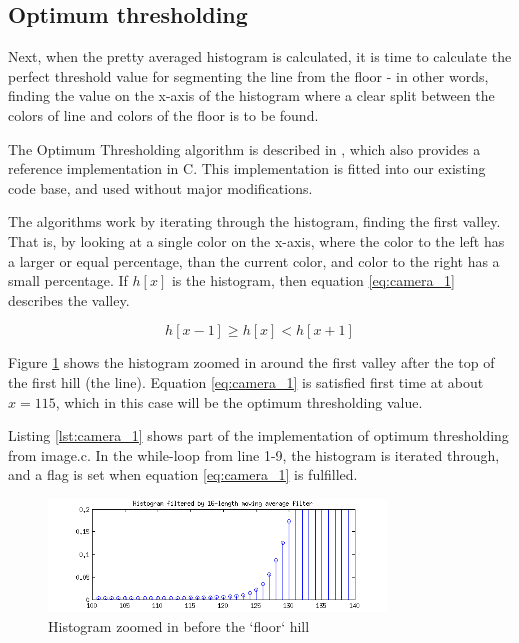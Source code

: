 
%
%
%
%
\subsection{Optimum thresholding}

Next, when the pretty averaged histogram is calculated, it is time to calculate the perfect threshold value for segmenting the line from the floor - in other words, finding the value on the x-axis of the histogram where a clear split between the colors of line and colors of the floor is to be found.

The Optimum Thresholding algorithm is described in \citep{myler1993}, which also provides a reference implementation in C. This implementation is fitted into our existing code base, and used without major modifications.  

The algorithms work by iterating through the histogram, finding the first valley. That is, by looking at a single color on the x-axis, where the color to the left has a larger or equal percentage, than the current color, and color to the right has a small percentage. If $h[x]$ is the histogram, then equation \ref{eq:camera_1} describes the valley.

\begin{equation}\label{eq:camera_1}
	h[x-1] \geq h[x] < h[x+1]
\end{equation}

Figure \ref{fig:camera_5} shows the histogram zoomed in around the first valley after the top of the first hill (the line). Equation \ref{eq:camera_1} is satisfied first time at about $x = 115$, which in this case will be the optimum thresholding value.

Listing \ref{lst:camera_1} shows part of the implementation of optimum thresholding from image.c. In the while-loop from line 1-9, the histogram is iterated through, and a flag is set when equation \ref{eq:camera_1} is fulfilled.

\begin{figure}[!ht]
	\centering
	\includegraphics[width=0.8\textwidth]{resources/hist-zoom-valley}
	\caption{Histogram zoomed in before the `floor` hill}
	\label{fig:camera_5}
\end{figure}


